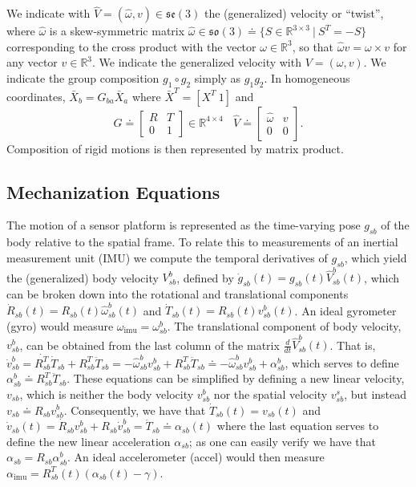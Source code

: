 \documentclass[]{article}
\newcommand{\ba}{\left[ \begin{array}}
\newcommand{\ea}{\end{array} \right]}
\def\real{\mathbb{R}}
\def\w{\omega}
\def\so{\mathfrak{so}}
\def\se{\mathfrak{se}}
\def\imu{_\mathrm{imu}}
\begin{document}
We indicate with $\widehat V = (\widehat \w, v) \in \se(3)$ the (generalized) velocity or ``twist'', where $\widehat \w$ is a skew-symmetric matrix $\widehat \w \in \so(3) \doteq \{S \in \real^{3\times 3} \ | \ S^T = -S\}$ corresponding to the cross product with the vector $\w \in \real^3$, so that $\widehat \w v = \w \times v$ for any vector $v\in \real^3$. We indicate the generalized velocity with $V = (\w, v)$. We indicate the group composition $g_1 \circ g_2$ simply as $g_1 g_2$. 
In homogeneous coordinates, $\bar X_b = G_{ba} \bar X_a$ where $\bar X^T = [X^T \ 1]$ and 
\begin{equation}
G \doteq \ba{cc} R & T \\ 0 & 1 \ea \in \real^{4\times 4}
~~~~
\hat V \doteq \ba{cc} \widehat \w & v \\ 0 & 0 \ea.
\end{equation}
Composition of rigid motions is then represented by matrix product.


\subsection{Mechanization Equations}

The motion of a sensor platform is represented as the time-varying pose $g_{sb}$ of the body relative to the spatial frame. To relate this to measurements of an inertial measurement unit (IMU) we compute the temporal derivatives of $g_{sb}$, which yield the (generalized) body velocity $V_{sb}^b$, defined by $\dot g_{sb}(t) = g_{sb}(t) {\widehat V}^b_{sb}(t)$, which can be broken down into the rotational and translational components $\dot R_{sb}(t) = R_{sb}(t) \widehat{\w}_{sb}^b(t)$ and $\dot T_{sb}(t) = R_{sb}(t) v_{sb}^b(t)$. An ideal gyrometer (gyro) would measure $\w\imu  = \w_{sb}^b$. The translational component of body velocity, $v_{sb}^b$, can be obtained from the last column of the matrix $\frac{d}{dt} {\widehat V}^b_{sb}(t)$. That is, $ \dot{v}_{sb}^b = \dot{R_{sb}^T}\dot T_{sb} + R_{sb}^T \ddot T_{sb} = - \widehat{\w}_{sb}^b v_{sb}^b + R_{sb}^T \ddot T_{sb} \doteq - \widehat{\w}_{sb}^b v_{sb}^b + \alpha_{sb}^b $, which serves to define $\alpha_{sb}^b \doteq R_{sb}^T \ddot T_{sb}
$. These equations can be simplified by defining a new linear velocity, $v_{sb}$, which is neither the body velocity $v_{sb}^b$ nor the spatial velocity $v_{sb}^s$, but instead $v_{sb} \doteq R_{sb}v_{sb}^b$. Consequently, we have that $ \dot T_{sb}(t) = v_{sb}(t) $ and $ \dot v_{sb}(t) = \dot R_{sb} v_{sb}^b + R_{sb} \dot{v}_{sb}^b = \ddot T_{sb} \doteq \alpha_{sb}(t) $ where the last equation serves to define the new linear acceleration $\alpha_{sb}$; as one can easily verify we have that $ \alpha_{sb} = R_{sb} \alpha_{sb}^b.$ An ideal accelerometer (accel) would then measure  $ \alpha\imu  = R_{sb}^T(t) (\alpha_{sb}(t) - \gamma)$.
\end{document}
